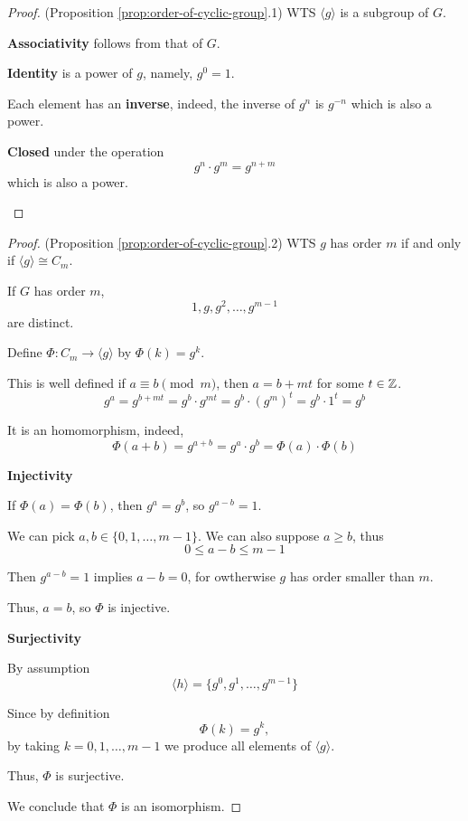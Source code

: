 \begin{proof}(Proposition \ref{prop:order-of-cyclic-group}.1)
    WTS $\langle g \rangle$ is a subgroup of $G$.

    \begin{listu}
        \item \textbf{Associativity} follows from that of $G$. 

        \item \textbf{Identity} is a power of $g$, namely, $g^0 = 1$.

        \item Each element has an \textbf{inverse}, indeed, the inverse of $g^n$ is $g^{-n}$ which is also a power. 

        \item \textbf{Closed} under the operation \[
            g^n \cdot g^m = g^{n + m}
        \] which is also a power. 
    \end{listu}
\end{proof}

\begin{proof}(Proposition \ref{prop:order-of-cyclic-group}.2)
    WTS $g$ has order $m$ if and only if $\langle g \rangle \cong C_m$.

    If $G$ has order $m$, \[
        1, g, g^2, \dots, g^{m - 1}
    \] are distinct.

    Define $\Phi: C_m \to \langle g \rangle$ by $\Phi(k) = g^k$.

    This is well defined if $a \equiv b \pmod{m}$, then $a = b + mt$ for some $t \in \mathbb{Z}$. \[
        g^a = g^{b + mt} = g^b \cdot g^{mt} = g^b \cdot (g^m)^t = g^b \cdot 1^t = g^b
    \] 

    It is an homomorphism, indeed, \[
        \Phi(a + b) = g^{a + b} = g^a \cdot g^b = \Phi(a) \cdot \Phi(b)
    \]

    \begin{listu}
        \item \textbf{Injectivity}
        
        If $\Phi(a) = \Phi(b)$, then $g^a = g^b$, so $g^{a - b} = 1$.

        We can pick $a, b \in \{ 0, 1, \dots, m - 1 \}$. We can also suppose $a \ge b$, thus \[
            0 \le a - b \le m - 1
        \]

        Then $g^{a - b} = 1$ implies $a - b = 0$, for owtherwise $g$ has order smaller than $m$. 

        Thus, $a = b$, so $\Phi$ is injective.

        \item \textbf{Surjectivity}

        By assumption \[
            \langle h \rangle = \{ g^0, g^1, \dots, g^{m - 1} \}
        \]

        Since by definition \[
            \Phi(k) = g^k,
        \] by taking $k = 0, 1, \dots, m - 1$ we produce all elements of $\langle g \rangle$.

        Thus, $\Phi$ is surjective.
    \end{listu}

    We conclude that $\Phi$ is an isomorphism.
\end{proof}

